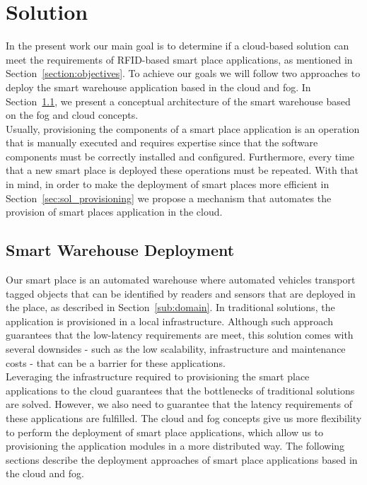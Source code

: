 
\chapter{Solution}
\label{chapter:solution}
In the present work our main goal is to determine if a cloud-based solution can meet the
requirements of RFID-based smart place applications, as mentioned in Section~\ref{section:objectives}.
To achieve our goals we will follow two approaches to deploy the smart warehouse application based
in the cloud and fog. In Section~\ref{sec:sol_smart_warehouse_deployment}, we present a
conceptual architecture of the smart warehouse based on the fog and cloud concepts.\\

Usually, provisioning the components of a smart place application is an operation that is manually executed and
requires expertise since that the software components must be correctly installed and configured.
Furthermore, every time that a new smart place is deployed these operations must be repeated. With
that in mind, in order to make the deployment of smart places more efficient in Section~\ref{sec:sol_provisioning}
we propose a mechanism that automates the provision of smart places application in the cloud.\\

\section{Smart Warehouse Deployment}
\label{sec:sol_smart_warehouse_deployment}
Our smart place is an automated warehouse where automated vehicles transport tagged objects that can
be identified by readers and sensors that are deployed in the place, as described in Section~\ref{sub:domain}.
In traditional solutions, the application is provisioned in a local infrastructure. Although such
approach guarantees that the low-latency requirements are meet, this solution comes with several
downsides - such as the low scalability, infrastructure and maintenance costs - that can be a barrier
for these applications.\\

Leveraging the infrastructure required to provisioning the smart place applications to the cloud
guarantees that the bottlenecks of traditional solutions are solved. However, we also need to
guarantee that the latency requirements of these applications are fulfilled. The cloud and fog concepts
give us more flexibility to perform the deployment of smart place applications, which allow us to
provisioning the application modules in a more distributed way. The following sections describe
the deployment approaches of smart place applications based in the cloud and fog.

